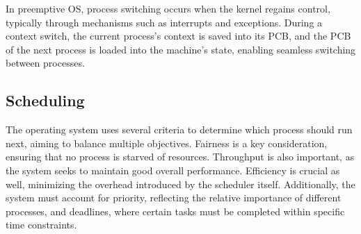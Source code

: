 In preemptive OS, process switching occurs when the kernel regains control, typically through mechanisms such as interrupts and exceptions. 
During a context switch, the current process's context is saved into its PCB, and the PCB of the next process is loaded into the machine's state, enabling seamless switching between processes.

\subsection{Scheduling}
The operating system uses several criteria to determine which process should run next, aiming to balance multiple objectives. 
Fairness is a key consideration, ensuring that no process is starved of resources. 
Throughput is also important, as the system seeks to maintain good overall performance. 
Efficiency is crucial as well, minimizing the overhead introduced by the scheduler itself. 
Additionally, the system must account for priority, reflecting the relative importance of different processes, and deadlines, where certain tasks must be completed within specific time constraints.

